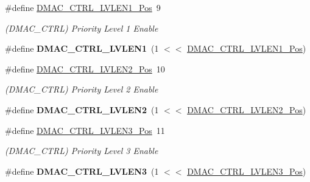 \begin{DoxyCompactItemize}
\item 
\hypertarget{group___s_a_m_l21___d_m_a_c_ga8f2b4629fc17c934a6d0951ab0756f75}{}\#define \hyperlink{group___s_a_m_l21___d_m_a_c_ga8f2b4629fc17c934a6d0951ab0756f75}{D\+M\+A\+C\+\_\+\+C\+T\+R\+L\+\_\+\+L\+V\+L\+E\+N1\+\_\+\+Pos}~9\label{group___s_a_m_l21___d_m_a_c_ga8f2b4629fc17c934a6d0951ab0756f75}

\begin{DoxyCompactList}\small\item\em (D\+M\+A\+C\+\_\+\+C\+T\+R\+L) Priority Level 1 Enable \end{DoxyCompactList}\item 
\hypertarget{group___s_a_m_l21___d_m_a_c_gad306bad6ffbf70e37833f90492413b24}{}\#define {\bfseries D\+M\+A\+C\+\_\+\+C\+T\+R\+L\+\_\+\+L\+V\+L\+E\+N1}~(1 $<$$<$ \hyperlink{group___s_a_m_l21___d_m_a_c_ga8f2b4629fc17c934a6d0951ab0756f75}{D\+M\+A\+C\+\_\+\+C\+T\+R\+L\+\_\+\+L\+V\+L\+E\+N1\+\_\+\+Pos})\label{group___s_a_m_l21___d_m_a_c_gad306bad6ffbf70e37833f90492413b24}

\item 
\hypertarget{group___s_a_m_l21___d_m_a_c_ga995ed9ef5115c746f5dde13a07ac5070}{}\#define \hyperlink{group___s_a_m_l21___d_m_a_c_ga995ed9ef5115c746f5dde13a07ac5070}{D\+M\+A\+C\+\_\+\+C\+T\+R\+L\+\_\+\+L\+V\+L\+E\+N2\+\_\+\+Pos}~10\label{group___s_a_m_l21___d_m_a_c_ga995ed9ef5115c746f5dde13a07ac5070}

\begin{DoxyCompactList}\small\item\em (D\+M\+A\+C\+\_\+\+C\+T\+R\+L) Priority Level 2 Enable \end{DoxyCompactList}\item 
\hypertarget{group___s_a_m_l21___d_m_a_c_ga29b8f5f6606fc40a5fd2b8ebf4603b32}{}\#define {\bfseries D\+M\+A\+C\+\_\+\+C\+T\+R\+L\+\_\+\+L\+V\+L\+E\+N2}~(1 $<$$<$ \hyperlink{group___s_a_m_l21___d_m_a_c_ga995ed9ef5115c746f5dde13a07ac5070}{D\+M\+A\+C\+\_\+\+C\+T\+R\+L\+\_\+\+L\+V\+L\+E\+N2\+\_\+\+Pos})\label{group___s_a_m_l21___d_m_a_c_ga29b8f5f6606fc40a5fd2b8ebf4603b32}

\item 
\hypertarget{group___s_a_m_l21___d_m_a_c_gaaafaedc709f3ce5a2005919dbdf029e3}{}\#define \hyperlink{group___s_a_m_l21___d_m_a_c_gaaafaedc709f3ce5a2005919dbdf029e3}{D\+M\+A\+C\+\_\+\+C\+T\+R\+L\+\_\+\+L\+V\+L\+E\+N3\+\_\+\+Pos}~11\label{group___s_a_m_l21___d_m_a_c_gaaafaedc709f3ce5a2005919dbdf029e3}

\begin{DoxyCompactList}\small\item\em (D\+M\+A\+C\+\_\+\+C\+T\+R\+L) Priority Level 3 Enable \end{DoxyCompactList}\item 
\hypertarget{group___s_a_m_l21___d_m_a_c_ga8011ed48cdca58a048d3ad2d69191ca6}{}\#define {\bfseries D\+M\+A\+C\+\_\+\+C\+T\+R\+L\+\_\+\+L\+V\+L\+E\+N3}~(1 $<$$<$ \hyperlink{group___s_a_m_l21___d_m_a_c_gaaafaedc709f3ce5a2005919dbdf029e3}{D\+M\+A\+C\+\_\+\+C\+T\+R\+L\+\_\+\+L\+V\+L\+E\+N3\+\_\+\+Pos})\label{group___s_a_m_l21___d_m_a_c_ga8011ed48cdca58a048d3ad2d69191ca6}


\end{DoxyCompactItemize}
